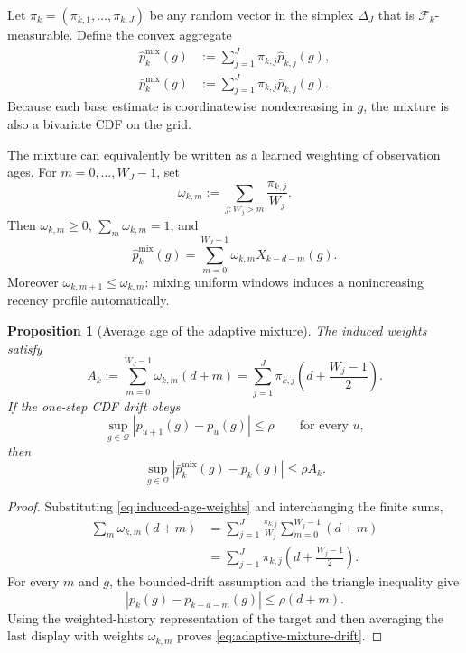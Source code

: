 \documentclass[11pt]{article}
\newtheorem{proposition}[theorem]{Proposition}
\newcommand{\F}{\mathcal{F}}
\newcommand{\Q}{\mathcal{Q}}
\newcommand{\1}{\mathbf{1}}
\begin{document}
Let $\pi_k=(\pi_{k,1},\ldots,\pi_{k,J})$ be any random vector in the simplex
$\Delta_J$ that is $\F_k$-measurable.  Define the convex aggregate
\begin{align}
    \widehat p_k^{\mathrm{mix}}(g)
    &:=%
    \sum_{j=1}^J \pi_{k,j}\widehat p_{k,j}(g),
    \label{eq:mixture-cdf}
    \\
    \bar p_k^{\mathrm{mix}}(g)
    &:=%
    \sum_{j=1}^J \pi_{k,j}\bar p_{k,j}(g).
    \label{eq:mixture-target}
\end{align}
Because each base estimate is coordinatewise nondecreasing in $g$, the mixture
is also a bivariate CDF on the grid.

The mixture can equivalently be written as a learned weighting of observation
ages.  For $m=0,\ldots,W_J-1$, set
\begin{equation}
    \omega_{k,m}
    :=
    \sum_{j:W_j>m}
    \frac{\pi_{k,j}}{W_j}.
    \label{eq:induced-age-weights}
\end{equation}
Then $\omega_{k,m}\ge0$, $\sum_m\omega_{k,m}=1$, and
\begin{equation}
    \widehat p_k^{\mathrm{mix}}(g)
    =
    \sum_{m=0}^{W_J-1}
    \omega_{k,m}X_{k-d-m}(g).
    \label{eq:mixture-as-weighted-history}
\end{equation}
Moreover $\omega_{k,m+1}\le\omega_{k,m}$: mixing uniform windows induces a
nonincreasing recency profile automatically.

\begin{proposition}[Average age of the adaptive mixture]
\label{prop:adaptive-average-age}
The induced weights satisfy
\begin{equation}
    A_k
    :=
    \sum_{m=0}^{W_J-1}\omega_{k,m}(d+m)
    =
    \sum_{j=1}^J
    \pi_{k,j}
    \left(d+\frac{W_j-1}{2}\right).
    \label{eq:adaptive-average-age}
\end{equation}
If the one-step CDF drift obeys
\[
    \sup_{g\in\Q}|p_{u+1}(g)-p_u(g)|\le\rho
    \qquad\text{for every }u,
\]
then
\begin{equation}
    \sup_{g\in\Q}
    |\bar p_k^{\mathrm{mix}}(g)-p_k(g)|
    \le
    \rho A_k.
    \label{eq:adaptive-mixture-drift}
\end{equation}
\end{proposition}

\begin{proof}
Substituting \eqref{eq:induced-age-weights} and interchanging the finite sums,
\begin{align*}
    \sum_m\omega_{k,m}(d+m)
    &=
    \sum_{j=1}^J
    \frac{\pi_{k,j}}{W_j}
    \sum_{m=0}^{W_j-1}(d+m)
    \\
    &=
    \sum_{j=1}^J
    \pi_{k,j}
    \left(d+\frac{W_j-1}{2}\right).
\end{align*}
For every $m$ and $g$, the bounded-drift assumption and the triangle inequality
give
\[
    |p_k(g)-p_{k-d-m}(g)|
    \le \rho(d+m).
\]
Using the weighted-history representation of the target and then averaging the
last display with weights $\omega_{k,m}$ proves
\eqref{eq:adaptive-mixture-drift}.
\end{proof}
\end{document}
